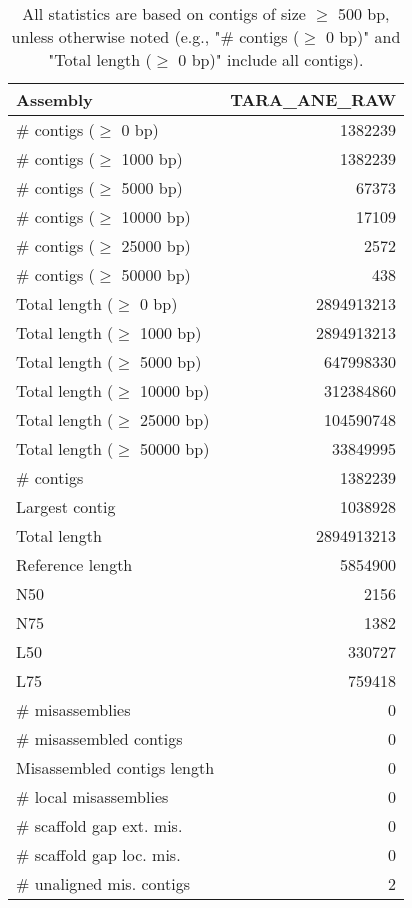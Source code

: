\documentclass[12pt,a4paper]{article}
\begin{document}
\begin{table}[ht]
\begin{center}
\caption{All statistics are based on contigs of size $\geq$ 500 bp, unless otherwise noted (e.g., "\# contigs ($\geq$ 0 bp)" and "Total length ($\geq$ 0 bp)" include all contigs).}
\begin{tabular}{|l*{1}{|r}|}
\hline
Assembly & TARA\_ANE\_RAW \\ \hline
\# contigs ($\geq$ 0 bp) & 1382239 \\ \hline
\# contigs ($\geq$ 1000 bp) & 1382239 \\ \hline
\# contigs ($\geq$ 5000 bp) & 67373 \\ \hline
\# contigs ($\geq$ 10000 bp) & 17109 \\ \hline
\# contigs ($\geq$ 25000 bp) & 2572 \\ \hline
\# contigs ($\geq$ 50000 bp) & 438 \\ \hline
Total length ($\geq$ 0 bp) & 2894913213 \\ \hline
Total length ($\geq$ 1000 bp) & 2894913213 \\ \hline
Total length ($\geq$ 5000 bp) & 647998330 \\ \hline
Total length ($\geq$ 10000 bp) & 312384860 \\ \hline
Total length ($\geq$ 25000 bp) & 104590748 \\ \hline
Total length ($\geq$ 50000 bp) & 33849995 \\ \hline
\# contigs & 1382239 \\ \hline
Largest contig & 1038928 \\ \hline
Total length & 2894913213 \\ \hline
Reference length & 5854900 \\ \hline
N50 & 2156 \\ \hline
N75 & 1382 \\ \hline
L50 & 330727 \\ \hline
L75 & 759418 \\ \hline
\# misassemblies & 0 \\ \hline
\# misassembled contigs & 0 \\ \hline
Misassembled contigs length & 0 \\ \hline
\# local misassemblies & 0 \\ \hline
\# scaffold gap ext. mis. & 0 \\ \hline
\# scaffold gap loc. mis. & 0 \\ \hline
\# unaligned mis. contigs & 2 \\ \hline

\end{tabular}
\end{center}
\end{table}
\end{document}
